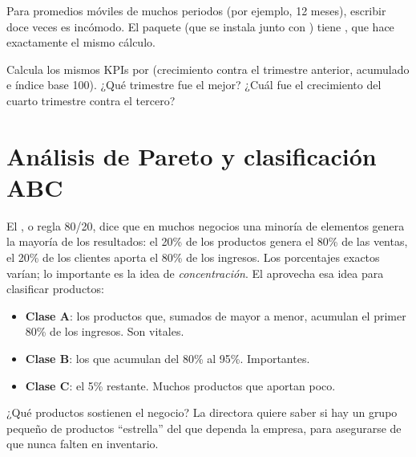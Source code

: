 \begin{consejo}
Para promedios móviles de muchos periodos (por ejemplo, 12 meses), escribir
 doce veces es incómodo. El paquete  (que se
instala junto con ) tiene
, que hace
exactamente el mismo cálculo.
\end{consejo}

\begin{hazlotu}
Calcula los mismos KPIs por  (crecimiento contra el
trimestre anterior, acumulado e índice base 100). ¿Qué trimestre fue el
mejor? ¿Cuál fue el crecimiento del cuarto trimestre contra el tercero?
\end{hazlotu}

\section{Análisis de Pareto y clasificación ABC}
\label{sec:m4-pareto}

El , o regla 80/20, dice que en muchos negocios
una minoría de elementos genera la mayoría de los resultados: el 20\% de los
productos genera el 80\% de las ventas, el 20\% de los clientes aporta el
80\% de los ingresos. Los porcentajes exactos varían; lo importante es la
idea de \emph{concentración}. El  aprovecha esa idea
para clasificar productos:

\begin{itemize}
  \item \textbf{Clase A}: los productos que, sumados de mayor a menor,
        acumulan el primer 80\% de los ingresos. Son vitales.
  \item \textbf{Clase B}: los que acumulan del 80\% al 95\%. Importantes.
  \item \textbf{Clase C}: el 5\% restante. Muchos productos que aportan poco.
\end{itemize}

\begin{ejemplo}{¿Qué productos sostienen el negocio?}
La directora quiere saber si hay un grupo pequeño de productos ``estrella''
del que dependa la empresa, para asegurarse de que nunca falten en
inventario.
\end{ejemplo}

